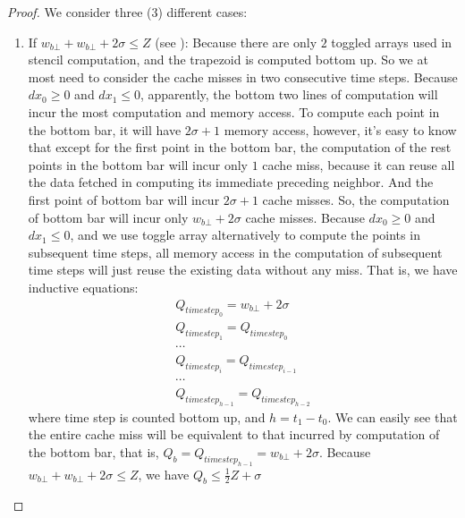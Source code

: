 \begin{proof}
We consider three (3) different cases:

\begin{enumerate}

	\item \label{case:bottomTrapezoid1} 
		  If $w_{b\bot} + w_{b\bot} + 2 \sigma \leq Z$ 
		  (see ): Because there are
          only $2$ toggled arrays used in stencil computation, and the
          trapezoid is computed bottom up. So we at most need to
          consider the cache misses in two consecutive time
          steps. Because $dx_0 \geq 0$ and $dx_1 \leq 0$, apparently,
          the bottom two lines of computation will incur the most
          computation and memory access. To compute each point in the 
          bottom bar, it will have $2 \sigma + 1$ memory access, however,
          it's easy to know that except for the first point in the bottom bar,
          the computation of the rest points in the bottom bar will incur
          only $1$ cache miss, because it can reuse all the data fetched in
          computing its immediate preceding neighbor. And the first point of
          bottom bar will incur $2 \sigma + 1$ cache misses. So, the computation
          of bottom bar will incur only $w_{b\bot} + 2 \sigma$ cache misses.
          Because $dx_0 \geq 0$ and $dx_1 \leq 0$, and we use toggle array 
          alternatively to compute the points in subsequent time steps, all
          memory access in the computation of subsequent time steps will just
          reuse the existing data without any miss. 
          That is, we have inductive equations:
            \begin{equation}
			\begin{array}{l}
				Q_{timestep_0} = w_{b\bot} + 2 \sigma \\
				Q_{timestep_1} = Q_{timestep_0} \\
				\cdots \\
				Q_{timestep_i} = Q_{timestep_{i-1}} \\
				\cdots \\
				Q_{timestep_{h-1}} = Q_{timestep_{h-2}} 
			\end{array} \label{eq:upTrapezoidCacheInduction}
			\end{equation}
          where time step is counted bottom up, and $h = t_1 - t_0$.
          We can easily see that the entire cache miss will be equivalent to that incurred by
          computation of the bottom bar, that is, $Q_b = Q_{timestep_{h-1}} = w_{b\bot} + 2 \sigma $.
          Because $w_{b\bot} + w_{b\bot} + 2 \sigma \leq Z$, we have
          $Q_b \leq \frac{1}{2} Z + \sigma$


\end{enumerate}
\end{proof}
